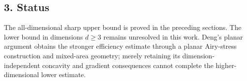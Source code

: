 \documentclass[11pt,a4paper]{article}
\begin{document}
\subsection{3. Status}

The all-dimensional sharp upper bound is proved in the preceding sections. The lower bound in dimensions \(d\ge3\) remains unresolved in this work. Deng's planar argument obtains the stronger efficiency estimate through a planar Airy-stress construction and mixed-area geometry; merely retaining its dimension-independent concavity and gradient consequences cannot complete the higher-dimensional lower estimate.
\end{document}
